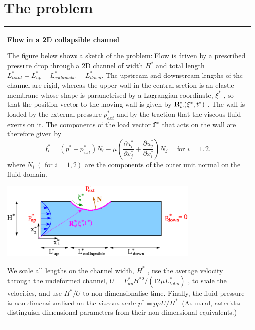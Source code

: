 \hypertarget{index_problem}{}\section{The problem}\label{index_problem}
\begin{center} \tabulinesep=1mm
\begin{longtabu} spread 0pt [c]{*{1}{|X[-1]}|}
\hline
\begin{center} {\bfseries Flow in a 2D collapsible channel } \end{center} 

The figure below shows a sketch of the problem\+: Flow is driven by a prescribed pressure drop through a 2D channel of width $ H^* $ and total length $ L^*_{total} = L^*_{up} + L^*_{collapsible} + L^*_{down}. $ The upstream and downstream lengths of the channel are rigid, whereas the upper wall in the central section is an elastic membrane whose shape is parametrised by a Lagrangian coordinate, $ \xi^* $ , so that the position vector to the moving wall is given by $ {\bf R}_w^*(\xi^*,t^*) $ . The wall is loaded by the external pressure $ p_{ext}^* $ and by the traction that the viscous fluid exerts on it. The components of the load vector $ {\bf f}^* $ that acts on the wall are therefore given by \[ f^*_{i} = (p^* - p^*_{ext}) N_i - \mu \left( \frac{\partial u^*_i}{\partial x^*_j} + \frac{\partial u^*_j}{\partial x^*_i} \right) N_j \ \ \ \ \ \ \mbox{for $i=1,2$,} \] where $ N_i \ (\mbox{\ for \ } i=1,2) $ are the components of the outer unit normal on the fluid domain.

 
\begin{DoxyImage}
\includegraphics[width=0.75\textwidth]{collapsible_channel_sketch}
\end{DoxyImage}


We scale all lengths on the channel width, $ H^* $ , use the average velocity through the undeformed channel, $ U =P^*_{up} H^{*2}/(12 \mu L^*_{total}) $ , to scale the velocities, and use $ H^{*}/U $ to non-\/dimensionalise time. Finally, the fluid pressure is non-\/dimensionalised on the viscous scale $ p^{*} = p \mu U/H^{*}$. (As usual, asterisks distinguish dimensional parameters from their non-\/dimensional equivalents.)


\end{longtabu}
\end{center}
